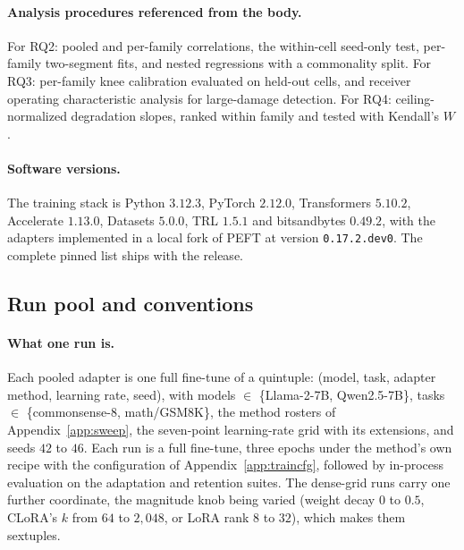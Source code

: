 \documentclass[11pt]{article}
\begin{document}
\paragraph{Analysis procedures referenced from the body.} For RQ2: pooled and
per-family correlations, the within-cell seed-only test, per-family
two-segment fits, and nested regressions with a commonality split. For RQ3:
per-family knee calibration evaluated on held-out cells, and receiver
operating characteristic analysis for large-damage detection. For RQ4:
ceiling-normalized degradation slopes, ranked within family and tested with
Kendall's $W$.

\paragraph{Software versions.} The training stack is Python $3.12.3$, PyTorch
$2.12.0$, Transformers $5.10.2$, Accelerate $1.13.0$, Datasets $5.0.0$, TRL
$1.5.1$ and bitsandbytes $0.49.2$, with the adapters implemented in a local
fork of PEFT at version \texttt{0.17.2.dev0}. The complete pinned list ships
with the release.

\subsection{Run pool and conventions}\label{app:pool}

\paragraph{What one run is.} Each pooled adapter is one full fine-tune of a
quintuple: (model, task, adapter method, learning rate, seed), with models
$\in$ \{Llama-2-7B, Qwen2.5-7B\}, tasks $\in$ \{commonsense-8, math/GSM8K\},
the method rosters of Appendix~\ref{app:sweep}, the seven-point
learning-rate grid with its extensions, and seeds $42$ to $46$. Each run is a
full fine-tune, three epochs under the method's own recipe with the
configuration of Appendix~\ref{app:traincfg}, followed by in-process
evaluation on the adaptation and retention suites. The dense-grid runs carry
one further coordinate, the magnitude knob being varied (weight decay $0$ to
$0.5$, CLoRA's $k$ from $64$ to $2{,}048$, or LoRA rank $8$ to $32$), which
makes them sextuples.
\end{document}
